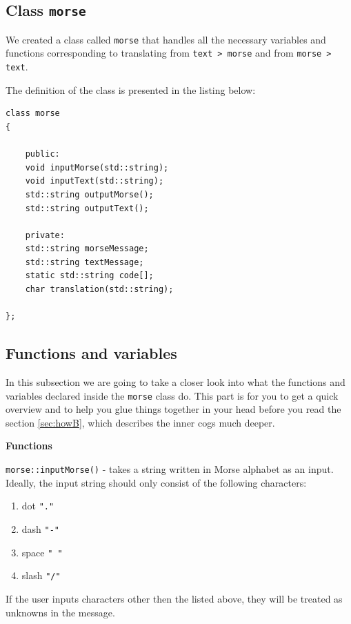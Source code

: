 \documentclass[12pt]{report}
\begin{document}
\subsection{Class \texttt{morse}}

We created a class called \verb|morse| that handles all the necessary variables and functions corresponding to translating from \verb|text > morse| and from \verb|morse > text|.

The definition of the class is presented in the listing below:

\begin{lstlisting}
class morse
{

	public:
	void inputMorse(std::string);
	void inputText(std::string);
	std::string outputMorse();
	std::string outputText();

	private:
	std::string morseMessage;
	std::string textMessage;
	static std::string code[];
	char translation(std::string);

};
\end{lstlisting}

\subsection{Functions and variables}

In this subsection we are going to take a closer look into what the functions and variables declared inside the \verb|morse| class do. This part is for you to get a quick overview and to help you glue things together in your head before you read the section \ref{sec:howB}, which describes the inner cogs much deeper.

\textbf{Functions}

\verb|morse::inputMorse()| - takes a string written in Morse alphabet as an input. Ideally, the input string should only consist of the following characters:

\begin{enumerate}
\item dot \verb|"."|

\item dash \verb|"-"|

\item space \verb|" "|

\item slash \verb|"/"|
\end{enumerate}

If the user inputs characters other then the listed above, they will be treated as unknowns in the message.
\end{document}
